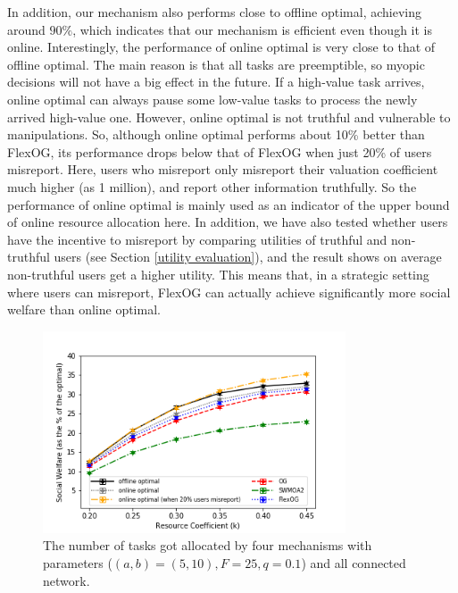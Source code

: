 \documentclass[11pt]{phdthesis}
\begin{document}
In addition, our mechanism also performs close to offline optimal, achieving around $ 90\% $, which indicates that our mechanism is efficient even though it is online. Interestingly, the performance of online optimal is very close to that of offline optimal. The main reason is that all tasks are preemptible, so myopic decisions will not have a big effect in the future. If a high-value task arrives, online optimal can always pause some low-value tasks to process the newly arrived high-value one. However, online optimal is not truthful and vulnerable to manipulations. So, although online optimal performs about 10\% better than FlexOG, its performance drops below that of FlexOG when just 20\% of users misreport. Here, users who misreport only misreport their valuation coefficient much higher (as 1 million), and report other information truthfully. So the performance of online optimal is mainly used as an indicator of the upper bound of online resource allocation here. In addition, we have also tested whether users have the incentive to misreport by comparing utilities of truthful and non-truthful users (see Section \ref{utility evaluation}), and the result shows on average non-truthful users get a higher utility. This means that, in a strategic setting where users can misreport, FlexOG can actually achieve significantly more social welfare than online optimal. 


\begin{figure}[h]
    \centering
    \includegraphics[width=0.8\textwidth]{./Figures/comparison of accepted number (resource-coefficient).png}
    \caption{The number of tasks got allocated by four mechanisms with parameters ($ (a, b) = (5, 10), F = 25, q = 0.1 $) and all connected network.}
    \label{fig: accepted_number_resource_coefficient} 
\end{figure}
\end{document}
